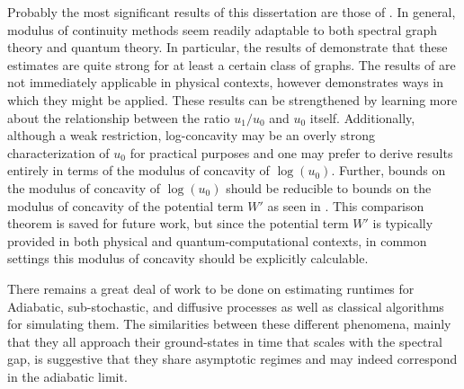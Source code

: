\documentclass[letterpaper,12pt]{umd-thesis}
\numberwithin{equation}{chapter}
\numberwithin{thm}{chapter}
\numberwithin{lem}{chapter}
\numberwithin{cor}{chapter}
\numberwithin{definition}{chapter}
\begin{document}
Probably the most significant results of this dissertation are those of . In general, modulus of continuity methods seem readily adaptable to both spectral graph theory and quantum theory. In particular, the results of  demonstrate that these estimates are quite strong for at least a certain class of graphs. The results of  are not immediately applicable in physical contexts, however  demonstrates ways in which they might be applied. These results can be strengthened by learning more about the relationship between the ratio $u_1/u_0$ and $u_0$ itself. Additionally, although a weak restriction, log-concavity may be an overly strong characterization of $u_0$ for practical purposes and one may prefer to derive results entirely in terms of the modulus of concavity of $\log(u_0)$. Further, bounds on the modulus of concavity of $\log(u_0)$ should be reducible to bounds on the modulus of concavity of the potential term $W'$ as seen in \cite{Andrews2011}. This comparison theorem is saved for future work, but since the potential term $W'$ is typically provided in both physical and quantum-computational contexts, in common settings this modulus of concavity should be explicitly calculable.

There remains a great deal of work to be done on estimating runtimes for Adiabatic, sub-stochastic, and diffusive processes as well as classical algorithms for simulating them. The similarities between these different phenomena, mainly that they all approach their ground-states in time that scales with the spectral gap, is suggestive that they share asymptotic regimes and may indeed correspond in the adiabatic limit. 





\end{document}
